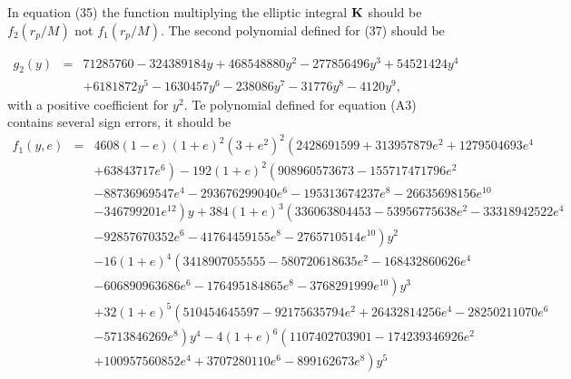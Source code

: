 \documentclass[aps,prd,amsfonts,amssymb,amsmath,nofootinbib,reprint,showpacs]{revtex4-1}
\begin{document}
In equation (35) the function multiplying the elliptic integral ${\bf{K}}$ should be $f_2(r_p/M)$ not $f_1(r_p/M)$.
The second polynomial defined for (37) should be
\begin{widetext}
\begin{eqnarray}
g_2(y) & = & 71285760-324389184 y+468548880 y^2-277856496 y^3+54521424 y^4 \nonumber \\
 & & + {} 6181872 y^5-1630457 y^6-238086 y^7-31776 y^8-4120 y^9,
\end{eqnarray}
with a positive coefficient for $y^2$. Te polynomial defined for equation (A3) contains several sign errors, it should be
\begin{eqnarray}
f_1(y,e) & = & 4608 (1-e) (1+e)^2 \left(3+e^2\right)^2 \left(2428691599+313957879 e^2+1279504693 e^4 \right.\nonumber \\
 & & + \left. 63843717 e^6\right)-192 (1+e)^2 \left(908960573673-155717471796 e^2 \right.\nonumber \\
 & & - \left. 88736969547 e^4-293676299040 e^6-195313674237 e^8-26635698156 e^{10} \right. \nonumber \\
 & & - \left. 346799201 e^{12}\right) y+384 (1+e)^3 \left(336063804453-53956775638 e^2-33318942522 e^4 \right. \nonumber \\
 & & - \left. 92857670352 e^6-41764459155 e^8-2765710514 e^{10}\right) y^2 \nonumber \\
 & & - \left. 16 (1+e)^4 \left(3418907055555-580720618635 e^2-168432860626 e^4 \right.\right. \nonumber \\
 & & - \left. 606890963686 e^6-176495184865 e^8-3768291999 e^{10}\right) y^3 \nonumber \\
 & & + \left. 32 (1+e)^5 \left(510454645597-92175635794 e^2+26432814256 e^4-28250211070 e^6 \right.\right. \nonumber \\
 & & - \left. 5713846269 e^8\right) y^4-4 (1+e)^6 \left(1107402703901-174239346926 e^2 \right. \nonumber \\
 & & + \left. 100957560852 e^4+3707280110 e^6-899162673 e^8\right) y^5 \nonumber \\ 

\end{eqnarray}
\end{widetext}
\end{document}
